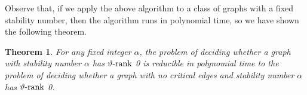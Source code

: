 \documentclass[11pt]{article}
\newtheorem{theorem}{Theorem}[section]
\numberwithin{equation}{section}
\newcommand{\rrank}{\vartheta\text{\rm -rank}}
\begin{document}

Observe that, if we apply the above algorithm to a class of graphs with a fixed stability number, then the algorithm runs in polynomial time, so we have shown the following theorem.

\begin{theorem}
For any fixed integer $\alpha$, the problem of deciding whether a graph with stability number $\alpha$ has $\rrank$ 0 is reducible in polynomial time to the problem of deciding whether a graph with no critical edges and stability number $\alpha$ has $\rrank$ 0.
\end{theorem}
\end{document}
